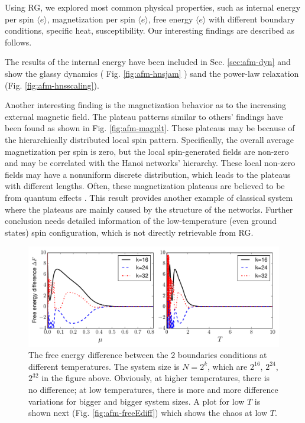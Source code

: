 Using RG, we explored most common physical properties, such as internal energy per spin $\langle e\rangle$, magnetization per spin $\langle e\rangle$, free energy $\langle e\rangle$ with different boundary conditions, specific heat, susceptibility. Our interesting findings are described as follows.

The results of the internal energy have been included in Sec. \ref{sec:afm-dyn} and show the glassy dynamics ( Fig. \ref{fig:afm-hnsjam} ) sand the power-law relaxation (Fig. \ref{fig:afm-hnsscaling}). 

Another interesting finding is the magnetization behavior as to the increasing external
 magnetic field. The plateau patterns similar to others' findings \cite{ohanyan2003mag} have
 been found as shown in Fig. \ref{fig:afm-magplt}. These plateaus may be because of the
 hierarchically distributed local spin pattern. Specifically, the overall average magnetization per
 spin is zero, but the local spin-generated fields are non-zero and may be correlated with the
 Hanoi networks' hierarchy. These local non-zero fields may have a nonuniform discrete
 distribution, which leads to the plateaus with different lengths. Often, these magnetization
 plateaus are believed to be from quantum effects 
\cite{kageyama1999pleatu, kageyama2000direct}. This result provides another example of
 classical system where the plateaus are mainly caused by the structure of the networks. 
Further conclusion needs detailed information of the low-temperature (even ground states)
 spin configuration, which is not directly retrievable from RG.

\begin{figure}
\centering \includegraphics[width=1\columnwidth]{Chapter-3/freeE_lowT2highT.pdf}
\protect\caption{The free energy difference between the 2 boundaries conditions at different temperatures. The system size is $N=2^k$, which are $2^{16}$, $2^{24}$, $2^{32}$ in the figure above. Obviously, at higher temperatures, there is no difference; at low temperatures, there is more and more difference variations for bigger and bigger system sizes. A plot for low $T$ is shown next (Fig. \ref{fig:afm-freeEdiff}) which shows the chaos at low $T$.  }
\label{fig:afm-freeEdiff_allT} 
\end{figure}

